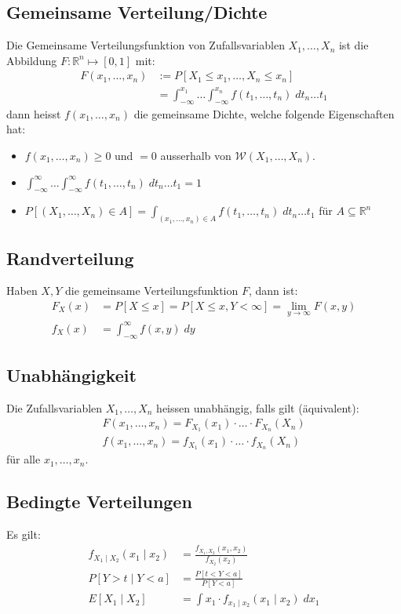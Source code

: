 \documentclass[8pt]{extarticle}
\newcommand{\R}{\mathbb{R}}
\newcommand{\W}{\mathcal{W}}
\newcommand{\ra}{\rightarrow}
\newcommand{\cond}[2]{P[#1 \; | \; #2]}
\newcommand{\zufallsvariablen}{X_1, \dots, X_n}
\begin{document}
\begin{multicols*}{3}
  \subsection*{Gemeinsame Verteilung/Dichte}
  Die Gemeinsame Verteilungsfunktion von Zufallsvariablen $\zufallsvariablen$ ist die Abbildung $F: \R^n \mapsto [0, 1]$ mit:
  \begin{align*}
    F (x_1, \dots, x_n) & := P[X_1 \leq x_1, \dots, X_n \leq x_n]                                                \\
                       & = \int_{-\infty}^{x_1} \dots \int_{-\infty}^{x_n} f (t_1, \dots, t_n) \; dt_n \dots t_1
  \end{align*}
  dann heisst $f (x_1, \dots, x_n)$ die gemeinsame Dichte, welche folgende
  Eigenschaften hat:
  \begin{itemize}
    \item $f (x_1, \dots, x_n) \geq 0$ und $= 0$ ausserhalb von $\W (\zufallsvariablen)$.
    \item $\int_{-\infty}^\infty \dots \int_{-\infty}^\infty f (t_1, \dots, t_n) \; dt_n \dots t_1 = 1$
    \item $P[ (\zufallsvariablen) \in A] = \int_{ (x_1, \dots, x_n) \in A} f (t_1, \dots, t_n) \; dt_n \dots t_1$ für $A \subseteq \R^n$
  \end{itemize}
  \subsection*{Randverteilung}
  Haben $X, Y$ die gemeinsame Verteilungsfunktion $F$, dann ist:
  \begin{align*}
    F_X (x) & = P[X \leq x] = P[X \leq x, Y < \infty] = \lim_{y \ra \infty} F (x, y) \\
    f_X (x) & = \int_{-\infty}^\infty f (x, y) \; dy
  \end{align*}
  \subsection*{Unabhängigkeit}
  Die Zufallsvariablen $\zufallsvariablen$ heissen unabhängig, falls gilt
   (äquivalent):
  \begin{align*}
    F (x_1, \dots, x_n) = F_{X_1} (x_1) \cdot \hdots \cdot F_{X_n} (X_n) \\
    f (x_1, \dots, x_n) = f_{X_1} (x_1) \cdot \hdots \cdot f_{X_n} (X_n)
  \end{align*}
  für alle $x_1, \dots, x_n$.
  \subsection*{Bedingte Verteilungen}
  Es gilt:
  \begin{align*}
    f_{X_1 \; | \; X_2} (x_1 \; | \; x_2) & = \frac{f_{X_1,  X_2} (x_1,  x_2)}{f_{X_2} (x_2)}               \\
    \cond{Y > t}{Y < a}                  & = \frac{P[t < Y < a]}{P[Y < a]}                               \\
    E[X_1 \; | \; X_2]                   & = \int x_1 \cdot f_{x_1 \; | \; x_2} (x_1 \; | \; x_2) \; dx_1
  \end{align*}

\end{multicols*}
\end{document}
